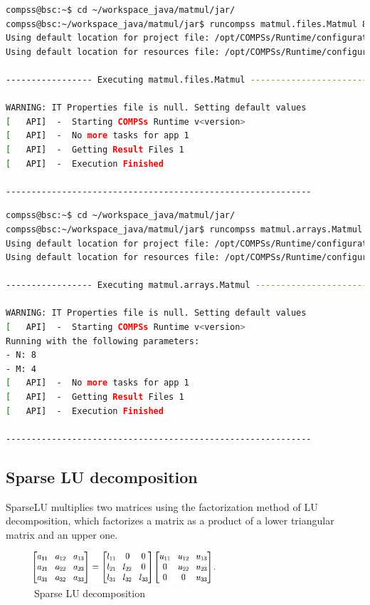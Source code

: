 \begin{lstlisting}[language=bash]
compss@bsc:~$ cd ~/workspace_java/matmul/jar/
compss@bsc:~/workspace_java/matmul/jar$ runcompss matmul.files.Matmul 8 4
Using default location for project file: /opt/COMPSs/Runtime/configuration/xml/projects/project.xml
Using default location for resources file: /opt/COMPSs/Runtime/configuration/xml/resources/resources.xml

----------------- Executing matmul.files.Matmul --------------------------

WARNING: IT Properties file is null. Setting default values
[   API]  -  Starting COMPSs Runtime v<version>
[   API]  -  No more tasks for app 1
[   API]  -  Getting Result Files 1
[   API]  -  Execution Finished

------------------------------------------------------------
\end{lstlisting}


\begin{lstlisting}[language=bash]
compss@bsc:~$ cd ~/workspace_java/matmul/jar/
compss@bsc:~/workspace_java/matmul/jar$ runcompss matmul.arrays.Matmul 8 4
Using default location for project file: /opt/COMPSs/Runtime/configuration/xml/projects/project.xml
Using default location for resources file: /opt/COMPSs/Runtime/configuration/xml/resources/resources.xml

----------------- Executing matmul.arrays.Matmul --------------------------

WARNING: IT Properties file is null. Setting default values
[   API]  -  Starting COMPSs Runtime v<version>
Running with the following parameters:
- N: 8
- M: 4
[   API]  -  No more tasks for app 1
[   API]  -  Getting Result Files 1
[   API]  -  Execution Finished

------------------------------------------------------------
\end{lstlisting}


\subsection{Sparse LU decomposition}
SparseLU multiplies two matrices using the factorization method of LU decomposition, which factorizes a 
matrix as a product of a lower triangular matrix and an upper one.

\begin{figure}[ht!]
  \centering
    \includegraphics[width=0.6\textwidth]{./Sections/2_Java/Figures/SparseLU.jpeg}
    \caption{Sparse LU decomposition}
    \label{fig:SparseLO}
\end{figure}

